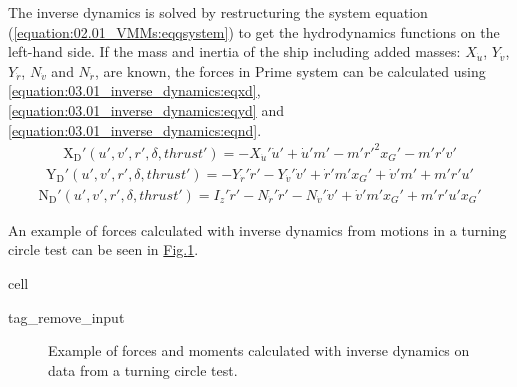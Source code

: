 \documentclass[review]{elsarticle}
\begin{document}
  
The inverse dynamics is solved by restructuring the system equation (\autoref{equation:02.01_VMMs:eqqsystem}) to get the hydrodynamics functions on the left-hand side. If the mass and inertia of the ship including added masses: \(X_{\dot{u}}\), \(Y_{\dot{v}}\), \(Y_{\dot{r}}\), \(N_{\dot{v}}\) and \(N_{\dot{r}}\), are known, the forces in Prime system can be calculated using \autoref{equation:03.01_inverse_dynamics:eqxd}, \autoref{equation:03.01_inverse_dynamics:eqyd} and \autoref{equation:03.01_inverse_dynamics:eqnd}.
\begin{equation}\label{equation:03.01_inverse_dynamics:eqxd}
\begin{split}\displaystyle \operatorname{X_{D}'}{\left(u',v',r',\delta,thrust' \right)} = - X_{\dot{u}}' \dot{u}' + \dot{u}' m' - m' r'^{2} x_{G}' - m' r' v'\end{split}
\end{equation}\begin{equation}\label{equation:03.01_inverse_dynamics:eqyd}
\begin{split}\displaystyle \operatorname{Y_{D}'}{\left(u',v',r',\delta,thrust' \right)} = - Y_{\dot{r}}' \dot{r}' - Y_{\dot{v}}' \dot{v}' + \dot{r}' m' x_{G}' + \dot{v}' m' + m' r' u'\end{split}
\end{equation}\begin{equation}\label{equation:03.01_inverse_dynamics:eqnd}
\begin{split}\displaystyle \operatorname{N_{D}'}{\left(u',v',r',\delta,thrust' \right)} = I_{z}' \dot{r}' - N_{\dot{r}}' \dot{r}' - N_{\dot{v}}' \dot{v}' + \dot{v}' m' x_{G}' + m' r' u' x_{G}'\end{split}
\end{equation}
  
An example of forces calculated with inverse dynamics from motions in a turning circle test can be seen in \hyperref[\detokenize{03.01_inverse_dynamics:fig-inverse}]{Fig.\@ \ref{\detokenize{03.01_inverse_dynamics:fig-inverse}}}.

 \begin{sphinxuseclass}{cell}
 \begin{sphinxuseclass}{tag_remove_input}
 \end{sphinxuseclass}
 \end{sphinxuseclass}
 \begin{figure}[H]
 \centering
 \capstart

 \noindent{}
 \caption{Example of forces and moments calculated with inverse dynamics on data from a turning circle test.}\label{\detokenize{03.01_inverse_dynamics:fig-inverse}}\end{figure}
\end{document}
